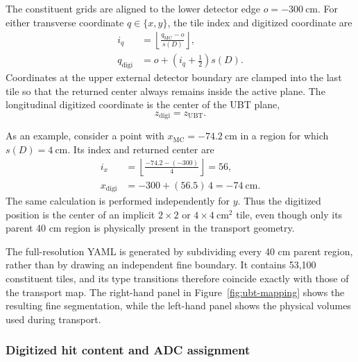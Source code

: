 The constituent grids are aligned to the lower detector edge
$o=-300~\mathrm{cm}$.  For either transverse coordinate $q\in\{x,y\}$, the
tile index and digitized coordinate are
\begin{align*}
  i_q &= \left\lfloor\frac{q_\mathrm{MC}-o}{s(D)}\right\rfloor, \\
  q_\mathrm{digi} &= o + \left(i_q+\frac{1}{2}\right)s(D).
\end{align*}
Coordinates at the upper external detector boundary are clamped into the last
tile so that the returned center always remains inside the active plane.  The
longitudinal digitized coordinate is the center of the UBT plane,
\[
  z_\mathrm{digi}=z_\mathrm{UBT}.
\]

As an example, consider a point with $x_\mathrm{MC}=-74.2~\mathrm{cm}$ in a
region for which $s(D)=4~\mathrm{cm}$.  Its index and returned center are
\begin{align*}
  i_x &= \left\lfloor\frac{-74.2-(-300)}{4}\right\rfloor=56, \\
  x_\mathrm{digi} &= -300+(56.5)\,4=-74~\mathrm{cm}.
\end{align*}
The same calculation is performed independently for $y$.  Thus the digitized
position is the center of an implicit $2\times2$ or $4\times4~\mathrm{cm^2}$
tile, even though only its parent 40 cm region is physically present in the
transport geometry.

The full-resolution YAML is generated by subdividing every 40 cm parent
region, rather than by drawing an independent fine boundary.  It contains
53,100 constituent tiles, and its type transitions therefore coincide exactly
with those of the transport map.  The right-hand panel in
Figure~\ref{fig:ubt-mapping} shows the resulting fine segmentation, while the
left-hand panel shows the physical volumes used during transport.

\subsubsection{Digitized hit content and ADC assignment}

